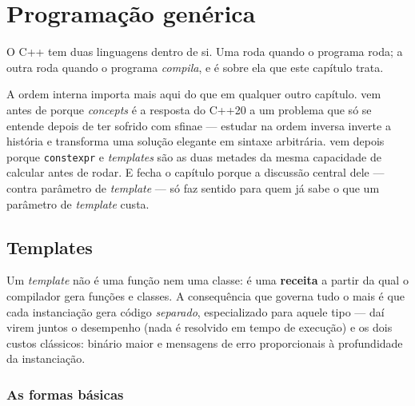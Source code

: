 
\section{Programação genérica}
\label{sec:generica}

O C++ tem duas linguagens dentro de si. Uma roda quando o programa roda; a outra
roda quando o programa \emph{compila}, e é sobre ela que este capítulo trata.

A ordem interna importa mais aqui do que em qualquer outro capítulo.
 vem antes de  porque \emph{concepts} é a
resposta do C++20 a um problema que só se entende depois de ter sofrido com
\gls{sfinae} --- estudar na ordem inversa inverte a história e transforma uma
solução elegante em sintaxe arbitrária.  vem depois
porque \texttt{constexpr} e \emph{templates} são as duas metades da mesma
capacidade de calcular antes de rodar. E  fecha o capítulo
porque a discussão central dele ---  contra parâmetro de
\emph{template} --- só faz sentido para quem já sabe o que um parâmetro de
\emph{template} custa.

\subsection{Templates}
\label{sec:templates}

Um \emph{template} não é uma função nem uma classe: é uma \textbf{receita} a
partir da qual o compilador gera funções e classes. A consequência que governa
tudo o mais é que cada instanciação gera código \emph{separado}, especializado
para aquele tipo --- daí virem juntos o desempenho (nada é resolvido em tempo de
execução) e os dois custos clássicos: binário maior e mensagens de erro
proporcionais à profundidade da instanciação.

\subsubsection{As formas básicas}

